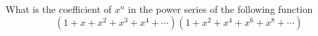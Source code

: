 What is the coefficient of $x^n$ in the power series
of the following function 
\[
(1 + x + x^2 + x^3 + x^4 + \cdots)
(1 + x^2 + x^4 + x^6 + x^8 + \cdots)
\]
